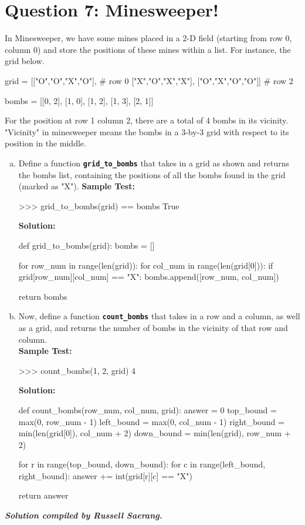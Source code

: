 \section{Question 7: Minesweeper!}
In Minesweeper, we have some mines placed in a 2-D field (starting from row 0, column
0) and store the positions of these mines within a list. For instance, the grid below.
\begin{python}
grid = [["O","O","X","O"],  # row 0
        ["X","O","X","X"],
        ["O","X","O","O"]]  # row 2

bombs = [[0, 2], [1, 0], [1, 2], [1, 3], [2, 1]]
\end{python}
For the position at row 1 column 2, there are a total of 4 bombs in its vicinity. "Vicinity" in
minesweeper means the bombs in a 3-by-3 grid with respect to its position in the middle.
\begin{enumerate}[(a)]
\item Define a function \texttt{\bfseries grid\_to\_bombs} that takes in a grid as shown and returns the
bombs list, containing the positions of all the bombs found in the grid (marked as "X").
\textbf{Sample Test:}
\begin{python}
>>> grid_to_bombs(grid) == bombs
True
\end{python}
\textbf{Solution:}
\begin{python}
def grid_to_bombs(grid):
    bombs = []
    
    for row_num in range(len(grid)):
        for col_num in range(len(grid[0])):
            if grid[row_num][col_num] == "X":
                bombs.append([row_num, col_num])
    
    return bombs
\end{python}

\item Now, define a function \texttt{\bfseries count\_bombs} that takes in a row and a column, as well as a
grid, and returns the number of bombs in the vicinity of that row and column. \\
\textbf{Sample Test:}
\begin{python}
>>> count_bombs(1, 2, grid)
4
\end{python}
\textbf{Solution:}
\begin{python}
def count_bombs(row_num, col_num, grid):
    answer = 0
    top_bound = max(0, row_num - 1)
    left_bound = max(0, col_num - 1)
    right_bound = min(len(grid[0]), col_num + 2)
    down_bound = min(len(grid), row_num + 2)

    for r in range(top_bound, down_bound):
        for c in range(left_bound, right_bound):
            answer += int(grid[r][c] == "X")

    return answer
\end{python}
\end{enumerate}

\begin{flushright}
\vspace{2 cm}\textbf{\textit{Solution compiled by Russell Saerang.}}
\end{flushright}
